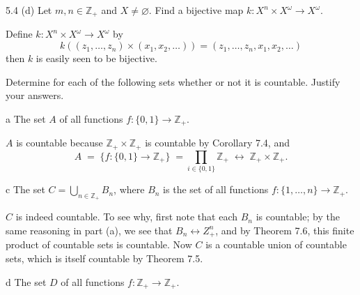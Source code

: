 \documentclass[11pt]{article}
\begin{document}



\begin{ex}{5.4 (d)}
  Let $m,n \in \mathbb{Z}_+$ and $X \neq \varnothing$. Find a bijective map $k: X^n \times X^\omega \to X^\omega$.
\end{ex}

\begin{solution}
   Define $k: X^n \times X^\omega \to X^\omega$ by
   \[k((z_1,\ldots,z_n) \times (x_1,x_2,\ldots)) = (z_1,\ldots,z_n,x_1,x_2,\ldots)\]
   then $k$ is easily seen to be bijective.
\end{solution}

\begin{ex}{7.5}
  Determine for each of the following sets whether or not it is countable. Justify your answers.
\end{ex}

\begin{p}{a}
  The set $A$ of all functions $f: \{0, 1\} \to \mathbb{Z}_+$.
\end{p}

\begin{solution}
  $A$ is countable because $\mathbb{Z}_+ \times \mathbb{Z}_+$ is countable by Corollary 7.4, and
  \[ A \;=\; \big\{ f: \{0, 1\} \to \mathbb{Z}_+ \big\}
       \;= \prod_{i \in \{0, 1\}} \mathbb{Z}_+
       \;\longleftrightarrow\; \mathbb{Z}_+ \times \mathbb{Z}_+.
  \]
\end{solution}

\begin{p}{c}
  The set $C = \bigcup_{n \in \mathbb{Z}_+} B_n$, where $B_n$ is the set of all
  functions $f:\{1,\ldots,n\} \to \mathbb{Z}_+$.
\end{p}

\begin{solution}
  $C$ is indeed countable. To see why, first note that each $B_n$ is countable;
  by the same reasoning in part (a), we see that $B_n \longleftrightarrow
  Z_+^n$, and by Theorem 7.6, this finite product of countable sets is
  countable. Now $C$ is a countable union of countable sets, which is itself
  countable by Theorem 7.5.
\end{solution}

\begin{p}{d}
  The set $D$ of all functions $f: \mathbb{Z}_+ \to \mathbb{Z}_+$.
\end{p}
\end{document}
